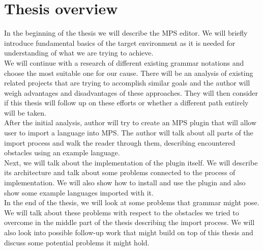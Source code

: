 \section{Thesis overview}

In the beginning of the thesis we will describe the MPS editor. We will briefly introduce fundamental basics of the target environment as it is needed for understanding of what we are trying to achieve.
\\

We will continue with a research of different existing grammar notations and choose the most suitable one for our cause. There will be an analysis of existing related projects that are trying to accomplish similar goals and the author will weigh advantages and disadvantages of these approaches. They will then consider if this thesis will follow up on these efforts or whether a different path entirely will be taken. 
\\

After the initial analysis, author will try to create an MPS plugin that will allow user to import a language into MPS. The author will talk about all parts of the import process and walk the reader through them, describing encountered obstacles using an example language. 
\\

Next, we will talk about the implementation of the plugin itself. We will describe its architecture and talk about some problems connected to the process of implementation. We will also show how to install and use the plugin and also show some example languages imported with it.
\\

In the end of the thesis, we will look at some problems that grammar might pose. We will talk about these problems with respect to the obstacles we tried to overcome in the middle part of the thesis describing the import process. We will also look into possible follow-up work that might build on top of this thesis and discuss some potential problems it might hold.